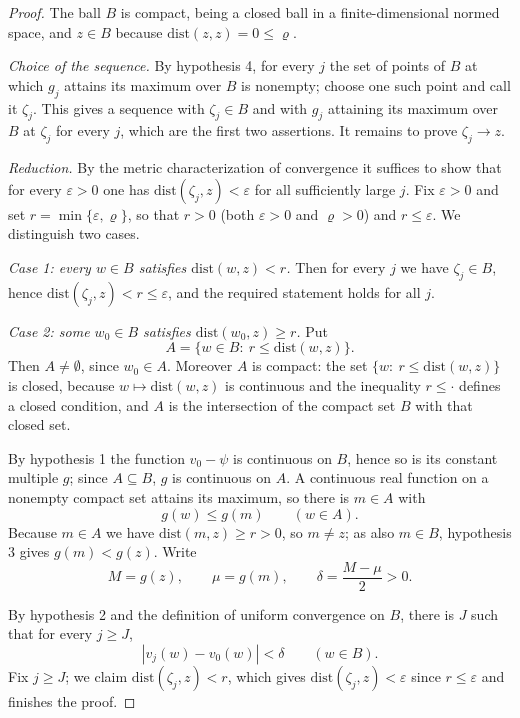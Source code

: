 \begin{proof}
The ball $B$ is compact, being a closed ball in a finite-dimensional normed
space, and $z\in B$ because $\mathrm{dist}(z,z)=0\le\varrho$.

\emph{Choice of the sequence.}
By hypothesis 4, for every $j$ the set of points of $B$ at which $g_j$ attains
its maximum over $B$ is nonempty; choose one such point and call it $\zeta_j$.
This gives a sequence with $\zeta_j\in B$ and with $g_j$ attaining its maximum
over $B$ at $\zeta_j$ for every $j$, which are the first two assertions. It
remains to prove $\zeta_j\to z$.

\emph{Reduction.}
By the metric characterization of convergence it suffices to show that for every
$\varepsilon>0$ one has $\mathrm{dist}(\zeta_j,z)<\varepsilon$ for all
sufficiently large $j$. Fix $\varepsilon>0$ and set
$r=\min\{\varepsilon,\varrho\}$, so that $r>0$ (both $\varepsilon>0$ and
$\varrho>0$) and $r\le\varepsilon$. We distinguish two cases.

\emph{Case 1: every $w\in B$ satisfies $\mathrm{dist}(w,z)<r$.}
Then for every $j$ we have $\zeta_j\in B$, hence
$\mathrm{dist}(\zeta_j,z)<r\le\varepsilon$, and the required statement holds for
all $j$.

\emph{Case 2: some $w_0\in B$ satisfies $\mathrm{dist}(w_0,z)\ge r$.}
Put
\[
  A=\{w\in B:\ r\le\mathrm{dist}(w,z)\}.
\]
Then $A\ne\emptyset$, since $w_0\in A$. Moreover $A$ is compact: the set
$\{w:\ r\le\mathrm{dist}(w,z)\}$ is closed, because $w\mapsto\mathrm{dist}(w,z)$
is continuous and the inequality $r\le\cdot$ defines a closed condition, and $A$
is the intersection of the compact set $B$ with that closed set.

By hypothesis 1 the function $v_0-\psi$ is continuous on $B$, hence so is its
constant multiple $g$; since $A\subseteq B$, $g$ is continuous on $A$. A
continuous real function on a nonempty compact set attains its maximum, so there
is $m\in A$ with
\begin{equation}\label{eq:mstm-mmax}
  g(w)\le g(m)\qquad(w\in A).
\end{equation}
Because $m\in A$ we have $\mathrm{dist}(m,z)\ge r>0$, so $m\ne z$; as also
$m\in B$, hypothesis 3 gives $g(m)<g(z)$. Write
\[
  M=g(z),\qquad \mu=g(m),\qquad \delta=\frac{M-\mu}{2}>0 .
\]

By hypothesis 2 and the definition of uniform convergence on $B$, there is $J$
such that for every $j\ge J$,
\begin{equation}\label{eq:mstm-unif}
  |v_j(w)-v_0(w)|<\delta\qquad(w\in B).
\end{equation}
Fix $j\ge J$; we claim $\mathrm{dist}(\zeta_j,z)<r$, which gives
$\mathrm{dist}(\zeta_j,z)<\varepsilon$ since $r\le\varepsilon$ and finishes the
proof.


\end{proof}
